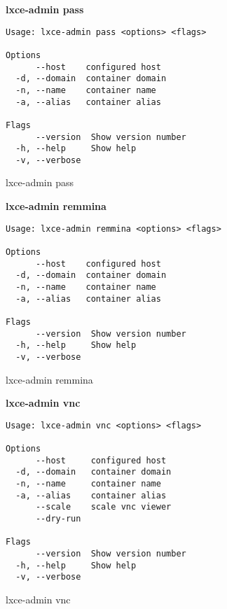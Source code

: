\newpage
\textbf{lxce-admin pass}
\begin{listing}[H]
\begin{verbatim}
Usage: lxce-admin pass <options> <flags>

Options
      --host    configured host                              
  -d, --domain  container domain                             
  -n, --name    container name                               
  -a, --alias   container alias                              

Flags
      --version  Show version number                        
  -h, --help     Show help                                  
  -v, --verbose
\end{verbatim}
\caption{lxce-admin pass}
\label{listings: lxce-admin pass}
\end{listing}

\textbf{lxce-admin remmina}
\begin{listing}[H]
\begin{verbatim}
Usage: lxce-admin remmina <options> <flags>

Options
      --host    configured host                              
  -d, --domain  container domain                             
  -n, --name    container name                               
  -a, --alias   container alias                              

Flags
      --version  Show version number                        
  -h, --help     Show help                                  
  -v, --verbose
\end{verbatim}
\caption{lxce-admin remmina}
\label{listings: lxce-admin remmina}
\end{listing}

\newpage
\textbf{lxce-admin vnc}
\begin{listing}[H]
\begin{verbatim}
Usage: lxce-admin vnc <options> <flags>

Options
      --host     configured host                             
  -d, --domain   container domain                            
  -n, --name     container name                              
  -a, --alias    container alias                             
      --scale    scale vnc viewer                            
      --dry-run                                              

Flags
      --version  Show version number                        
  -h, --help     Show help                                  
  -v, --verbose
\end{verbatim}
\caption{lxce-admin vnc}
\label{listings: lxce-admin vnc}
\end{listing}


